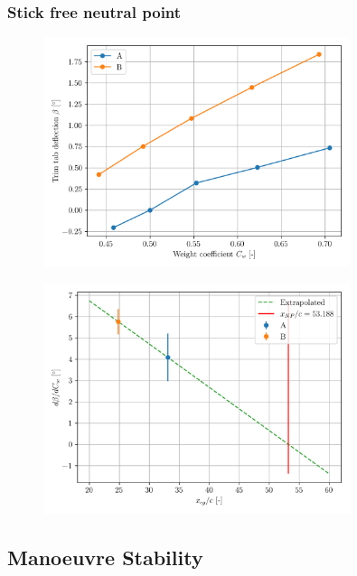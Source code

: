 \documentclass{article}
\begin{document}
\subsubsection{Stick free neutral point}
\begin{figure}[H]
    \centering
    \includegraphics[width=0.8\textwidth]{Longitudinal_Static_Stability_3.png}
    \caption{}
    \label{fig:Longitudinal_Static_Stability_3}
\end{figure}
\begin{figure}[H]
    \centering
    \includegraphics[width=0.8\textwidth]{Longitudinal_Static_Stability_4.png}
    \caption{}
    \label{fig:Longitudinal_Static_Stability_4}
\end{figure}

\subsection{Manoeuvre Stability}
\end{document}
